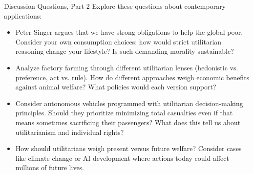 \documentclass[aspectratio=169]{beamer}
\begin{document}
\begin{frame}{Discussion Questions, Part 2}
    Explore these questions about contemporary applications:
    \begin{itemize}
        \item Peter Singer argues that we have strong obligations to help the global poor. Consider your own consumption choices: how would strict utilitarian reasoning change your lifestyle? Is such demanding morality sustainable?
        
        \item Analyze factory farming through different utilitarian lenses (hedonistic vs. preference, act vs. rule). How do different approaches weigh economic benefits against animal welfare? What policies would each version support?
        
        \item Consider autonomous vehicles programmed with utilitarian decision-making principles. Should they prioritize minimizing total casualties even if that means sometimes sacrificing their passengers? What does this tell us about utilitarianism and individual rights?
        
        \item How should utilitarians weigh present versus future welfare? Consider cases like climate change or AI development where actions today could affect millions of future lives.
    \end{itemize}
\end{frame}
\end{document}
